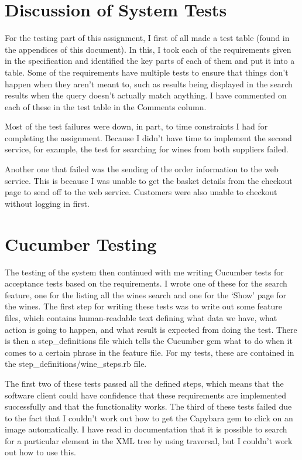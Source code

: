 \documentclass[a4paper,12pt,hidelinks]{report}
\begin{document}
    \section{Discussion of System Tests}
    For the testing part of this assignment, I first of all made a 
    test table (found in the appendices of this document). In this,
    I took each of the requirements given in the specification and identified the key parts of each of them and put it into a
    table. Some of the requirements have multiple tests to ensure that things don't happen when they aren't meant to, such as results
    being displayed in the search results when the query doesn't actually match anything. I have commented on each of these
    in the test table in the Comments column. 
    
    Most of the test failures were down, in part, to time constraints I had for completing
    the assignment. Because I didn't have time to implement the second service, for example, the test for searching for wines
    from both suppliers failed.

    Another one that failed was the sending of the order information to the web service. This is because I was unable to get
    the basket details from the checkout page to send off to the web service. Customers were also unable to checkout without
    logging in first.

    \section{Cucumber Testing}
    The testing of the system then continued with me writing Cucumber tests for acceptance tests based on the requirements.
    I wrote one of these for the search feature, one for the listing all the wines search and one for the `Show' page for
    the wines. The first step for writing these tests was to write out some feature files, which contains human-readable text defining
    what data we have, what action is going to happen, and what result is expected from doing the test. There is then a step\_definitions
    file which tells the Cucumber gem what to do when it comes to a certain phrase in the feature file. For my tests, these are contained
    in the step\_definitions/wine\_steps.rb file.

    The first two of these tests passed all the defined steps, which means that the software client could have confidence that these
    requirements are implemented successfully and that the functionality works. The third of these tests failed due to the fact that I couldn't
    work out how to get the Capybara gem to click on an image automatically. I have read in documentation that it is possible to
    search for a particular element in the XML tree by using traversal, but I couldn't work out how to use this.
\end{document}
